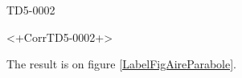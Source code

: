 
\begin{corrige}{TD5-0002}

<+CorrTD5-0002+>


The result is on figure \ref{LabelFigAireParabole}.
\newcommand{\CaptionFigAireParabole}{<+Type your caption here+>}

\end{corrige}
